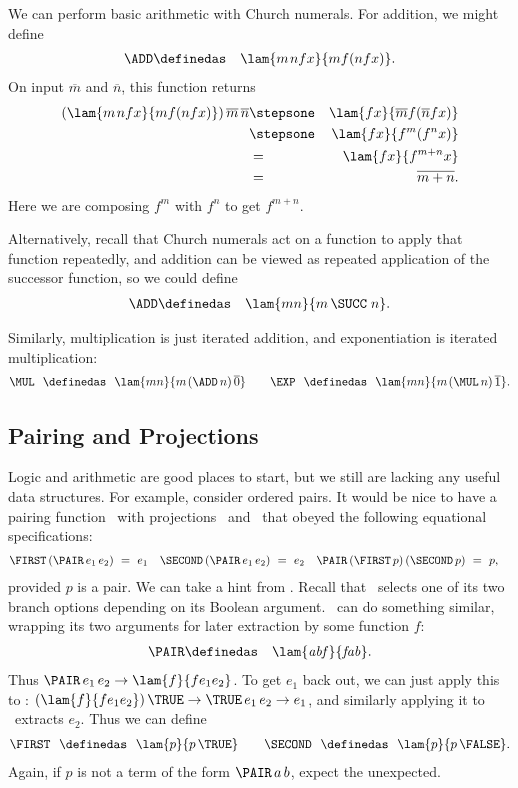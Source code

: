 We can perform basic arithmetic with Church numerals.  For addition, we might define
\begin{eqnarray*}
\ADD &\definedas& \lam{m\kern1ptnfx}{mf(nfx)}.
\end{eqnarray*}
On input $\overline m$ and $\overline n$, this function returns
\begin{eqnarray*}
(\lam{m\kern1ptnfx}{mf(nfx)})\,\overline m\,\overline n
&\stepsone& \lam{fx}{\overline mf(\overline nfx)}\\
&\stepsone& \lam{fx}{f^{m}(f^{n}x)}\\
&=& \lam{fx}{f^{m+n}x}\\
&=& \overline{m+n}.
\end{eqnarray*}
Here we are composing $f^{m}$ with $f^{n}$ to get $f^{m+n}$.

Alternatively, recall that Church numerals act on a function to apply that function repeatedly, and addition can be viewed as repeated application of the successor function, so we could define
\begin{eqnarray*}
\ADD &\definedas& \lam{mn}{m\,\SUCC\;n}.
\end{eqnarray*}

Similarly, multiplication is just iterated addition, and exponentiation is iterated multiplication:
\begin{eqnarray*}
\MUL\ \ \definedas\ \ \lam{mn}{m\kern1pt(\ADD\,n)\,\overline 0} &\quad& \EXP\ \ \definedas\ \ \lam{mn}{m\kern1pt(\MUL\,n)\,\overline 1}.
\end{eqnarray*}

\subsection{Pairing and Projections}

Logic and arithmetic are good places to start, but we still are lacking any useful data structures.  For example, consider ordered pairs.  It would be nice to have a pairing function \PAIR\ with projections \FIRST\ and \SECOND\ that obeyed the following equational specifications:
\begin{align*} 
\FIRST\,(\PAIR\,e_1\,e_2)\ &=\ e_1 &
\SECOND\,(\PAIR\,e_1\,e_2)\ &=\ e_2 &
\PAIR\,(\FIRST\,p)\,(\SECOND\,p)\ &=\ p,
\end{align*}
provided $p$ is a pair.  We can take a hint from \IF.  Recall that \IF\ selects one of its two branch options depending on its Boolean argument.  \PAIR\ can do something similar, wrapping its two arguments for later extraction by some function $f$:
\begin{eqnarray*} 
\PAIR &\definedas& \lam{\mathit{abf}}{\mathit{fab}}.
\end{eqnarray*}
Thus $\PAIR\,e_1\,e_2 \rightarrow \lam{f}{fe_1e_2}$.
To get $e_1$ back out, we can just apply this to \TRUE: $(\lam{f}{fe_1e_2})\,\TRUE \rightarrow \TRUE\,e_1\,e_2\rightarrow e_1$, and similarly applying it to \FALSE\ extracts $e_2$.  Thus we can define
\begin{eqnarray*}
\FIRST\ \ \definedas\ \ \lam{p}{p\,\TRUE} &\quad& \SECOND\ \ \definedas\ \ \lam{p}{p\,\FALSE}.
\end{eqnarray*}
Again, if $p$ is not a term of the form $\PAIR\,a\,b$, expect the unexpected.

